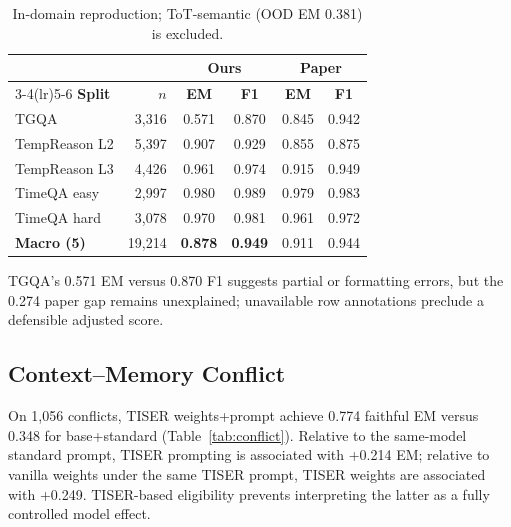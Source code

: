 \documentclass[conference]{IEEEtran}
\begin{document}
\begin{table}[t]
\centering
\caption{In-domain reproduction; ToT-semantic (OOD EM 0.381) is excluded.}
\label{tab:baseline}
\setlength{\tabcolsep}{3.7pt}
{\footnotesize
\begin{tabular}{lrcccc}
\toprule
& & \multicolumn{2}{c}{\textbf{Ours}} & \multicolumn{2}{c}{\textbf{Paper}} \\
\cmidrule(lr){3-4}\cmidrule(lr){5-6}
\textbf{Split} & \textbf{$n$} & \textbf{EM} & \textbf{F1} & \textbf{EM} & \textbf{F1} \\
\midrule
TGQA            & 3{,}316 & 0.571 & 0.870 & 0.845 & 0.942 \\
TempReason L2   & 5{,}397 & 0.907 & 0.929 & 0.855 & 0.875 \\
TempReason L3   & 4{,}426 & 0.961 & 0.974 & 0.915 & 0.949 \\
TimeQA easy     & 2{,}997 & 0.980 & 0.989 & 0.979 & 0.983 \\
TimeQA hard     & 3{,}078 & 0.970 & 0.981 & 0.961 & 0.972 \\
\midrule
\rowcolor{gray!18}
\textbf{Macro (5)} & 19{,}214 & \textbf{0.878} & \textbf{0.949} & 0.911 & 0.944 \\
\bottomrule
\end{tabular}
}
\end{table}

TGQA's 0.571 EM versus 0.870 F1 suggests partial or formatting errors, but the 0.274 paper gap remains unexplained; unavailable row annotations preclude a defensible adjusted score.

\subsection{Context--Memory Conflict}

On 1,056 conflicts, TISER weights+prompt achieve 0.774 faithful EM versus 0.348 for base+standard (Table~\ref{tab:conflict}). Relative to the same-model standard prompt, TISER prompting is associated with +0.214 EM; relative to vanilla weights under the same TISER prompt, TISER weights are associated with +0.249. TISER-based eligibility prevents interpreting the latter as a fully controlled model effect.
\end{document}
